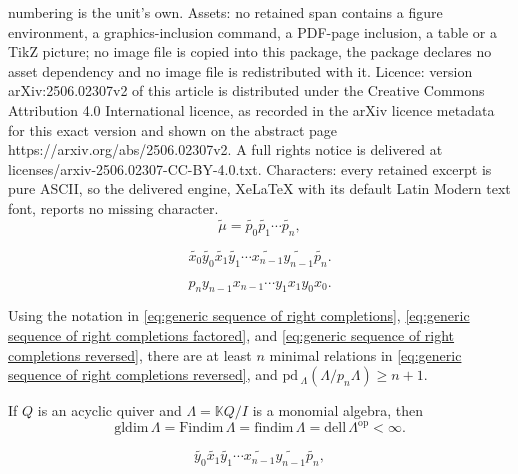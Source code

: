 \documentclass[10pt,a4paper]{amsart}
\newcommand{\Findim}{\mathrm{Findim}\,}
\newcommand{\dell}{\mathrm{dell}\,}
\newcommand{\findim}{\mathrm{findim}\,}
\newcommand{\gldim}{\mathrm{gldim}\,}
\newcommand{\op}{\mathrm{op}}
\newcommand{\pd}{\mathrm{pd}\,}
\renewcommand{\k}{\mathbb{K}}
\begin{document}
numbering is the unit's own. Assets: no retained span contains a figure environment, a graphics-inclusion command, a PDF-page inclusion, a table or a TikZ picture; no image file is copied into this package, the package declares no asset dependency and no image file is redistributed with it. Licence: version arXiv:2506.02307v2 of this article is distributed under the Creative Commons Attribution 4.0 International licence, as recorded in the arXiv licence metadata for this exact version and shown on the abstract page https://arxiv.org/abs/2506.02307v2. A full rights notice is delivered at licenses/arxiv-2506.02307-CC-BY-4.0.txt. Characters: every retained excerpt is pure ASCII, so the delivered engine, XeLaTeX with its default Latin Modern text font, reports no missing character.
\begin{equation}
\label{eq:generic sequence of right completions}
\tilde{\mu}=\widetilde{p_0}\widetilde{p_1}\cdots \widetilde{p_n},
\end{equation}

\begin{equation}
\label{eq:generic sequence of right completions factored}
\widetilde{x_0}\widetilde{y_0}\widetilde{x_1}\widetilde{y_1}\cdots \widetilde{x_{n-1}}\widetilde{y_{n-1}} \widetilde{p_n}.
\end{equation}

\begin{equation}
\label{eq:generic sequence of right completions reversed}
p_n y_{n-1}x_{n-1}\cdots y_1x_1y_0x_0.
\end{equation}

\begin{lemma}
\label{lem:existence of module with pd equal dell}
Using the notation in \eqref{eq:generic sequence of right completions}, \eqref{eq:generic sequence of right completions factored}, and \eqref{eq:generic sequence of right completions reversed}, there are at least $n$ minimal relations in \eqref{eq:generic sequence of right completions reversed}, and $\pd\!_{\Lambda} (\Lambda/p_n\Lambda) \geq n+1$.
\end{lemma}

\begin{proposition}
\label{prop:tree dell findim}
If $Q$ is an acyclic quiver and $\Lambda=\k Q/I$ is a monomial algebra, then 
\[
\gldim\Lambda=\Findim\Lambda=\findim\Lambda = \dell\Lambda^{\op}<\infty.
\]
\end{proposition}

\begin{equation}
\label{eq:tree dell findim factored}
\widetilde{y_0}\widetilde{x_1}\widetilde{y_1}\cdots \widetilde{x_{n-1}}\widetilde{y_{n-1}} \widetilde{p_n},
\end{equation}
\end{document}
